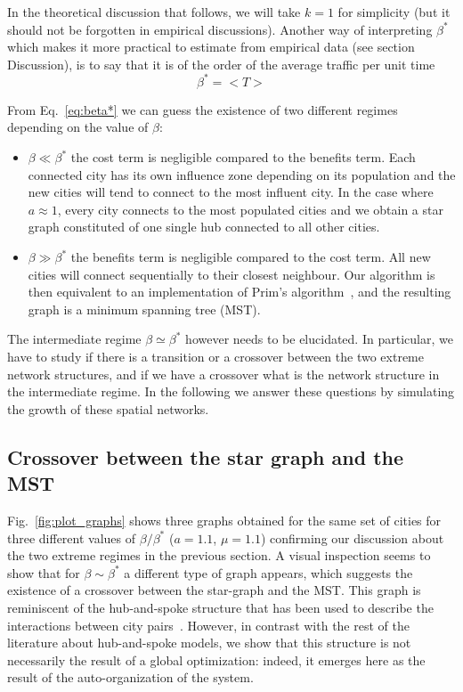 In the theoretical discussion that follows, we will take $k=1$ for simplicity (but it should not be forgotten in empirical discussions). Another way of interpreting $\beta^*$ which makes it more practical to estimate from empirical data (see section Discussion), is to say that it is of the order of the average traffic per unit time
%
\begin{equation}
\label{eq:beta*_traffic}
\beta^* = < T >
\end{equation}

From Eq.~\ref{eq:beta*} we can guess the existence of two different regimes depending on the value of $\beta$:
\begin{itemize}
\item $\beta \ll \beta^*$ the cost term is negligible compared to the benefits term. Each connected city has its own influence zone depending on its population and the new cities will tend to connect to the most influent city. In the case where $a\approx 1$, every city connects to the most populated cities and we obtain a star graph constituted of one single hub connected to all other cities.
\item $\beta \gg \beta^*$ the benefits term is negligible compared to the cost term. All new cities will connect sequentially to their closest neighbour. Our algorithm is then equivalent to an implementation of Prim's algorithm~\cite{Prim:1957}, and the resulting graph is a minimum spanning tree (MST).
\end{itemize}

The intermediate regime $\beta\simeq\beta^*$ however needs to be elucidated.  In particular, we have to study if there is a transition or a crossover between the two extreme network structures, and if we have a crossover what is the network structure in the intermediate regime. In the following we answer these questions by simulating the growth of these spatial networks.

\subsection{Crossover between the star graph and the MST}

Fig.~\ref{fig:plot_graphs} shows three graphs obtained for the same set of cities for three different values of $\beta/\beta^*$ ($a=1.1$, $\mu=1.1$) confirming our discussion about the two extreme regimes in the previous section. A visual inspection seems to show that for $\beta \sim \beta^*$ a different type of graph appears, which suggests the existence of a crossover between the star-graph and the MST. This graph is reminiscent of the hub-and-spoke structure that has been used to describe the interactions between city pairs~\cite{OKelly:1998,OKelly:1996}. However, in contrast with the rest of the literature about hub-and-spoke models, we show that this structure is not necessarily the result of a global optimization: indeed, it emerges here as the result of the auto-organization of the system.


